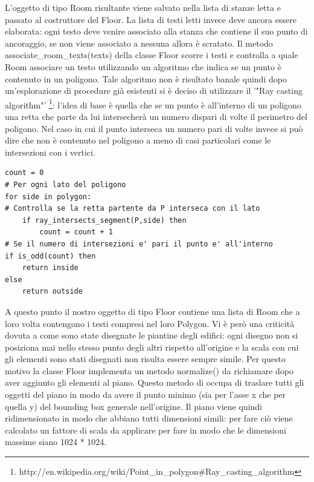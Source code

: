 \documentclass[12pt]{report}
\begin{document}
L'oggetto di tipo Room risultante viene salvato nella lista di stanze letta e passato al costruttore del Floor. La lista di testi letti invece deve ancora essere elaborata: ogni testo deve venire associato alla stanza che contiene il suo punto di ancoraggio, se non viene associato a nessuna allora è scratato.
Il metodo associate\_room\_texts(texts) della classe Floor scorre i testi e controlla a quale Room associare un testo utilizzando un algoritmo che indica se un punto è contenuto in un poligono. 
Tale algoritmo non è risultato banale quindi dopo un'esplorazione di procedure già esistenti si è deciso di utilizzare il '"Ray casting algorithm"' \footnote{http://en.wikipedia.org/wiki/Point\_in\_polygon\#Ray\_casting\_algorithm}: l'idea di base è quella che se un punto è all'interno di un poligono una retta che parte da lui intersecherà un numero dispari di volte il perimetro del poligono. Nel caso in cui il punto interseca un numero pari di volte invece si può dire che non è contenuto nel poligono a meno di casi particolari come le intersezioni con i vertici.

\begin{lstlisting}[label=codice,caption=Ray casting algorithm in pseudocodice, frame=single]
count = 0
# Per ogni lato del poligono
for side in polygon:
# Controlla se la retta partente da P interseca con il lato
    if ray_intersects_segment(P,side) then
        count = count + 1
# Se il numero di intersezioni e' pari il punto e' all'interno
if is_odd(count) then    
    return inside
else
    return outside
\end{lstlisting}

\vspace{5mm} %

A questo punto il nostro oggetto di tipo Floor contiene una lista di Room che a loro volta contengono i testi compresi nel loro Polygon. 
Vi è però una criticità dovuta a come sono state disegnate le piantine degli edifici: ogni disegno non si posiziona mai nello stesso punto degli altri rispetto all'origine e la scala con cui gli elementi sono stati disegnati non risulta essere sempre simile. 
Per questo motivo la classe Floor implementa un metodo normalize() da richiamare dopo aver aggiunto gli elementi al piano. 
Questo metodo di occupa di traslare tutti gli oggetti del piano in modo da avere il punto minimo (sia per l'asse x che per quella y) del bounding box generale nell'origine. 
Il piano viene quindi ridimensionato in modo che abbiano tutti dimensioni simili: per fare ciò viene calcolato un fattore di scala da applicare per fare in modo che le dimensioni massime siano 1024 * 1024.
\end{document}
